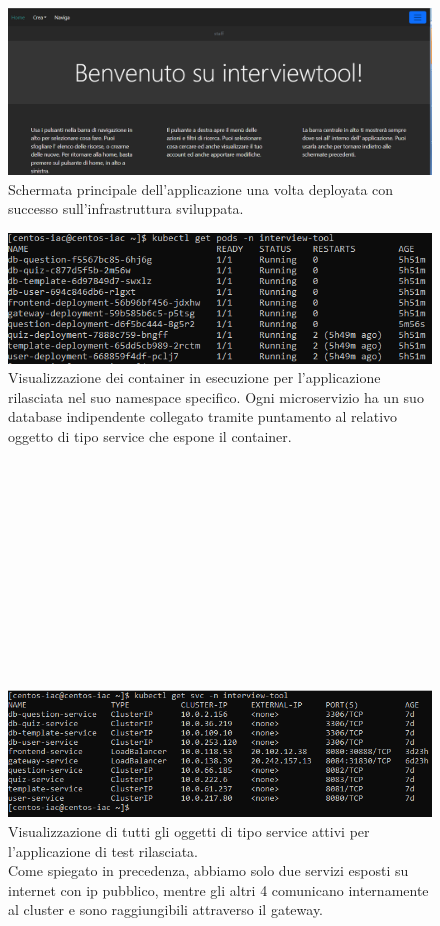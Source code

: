 \documentclass[a4paper,12pt]{report}
\begin{document}
\begin{figure}[h]
	\includegraphics[width=1.0\textwidth]{app_micro}
    \caption{Schermata principale dell'applicazione una volta deployata con successo sull'infrastruttura sviluppata.}
    \label{fig:app_micro}
\end{figure} 
\begin{figure}[h]
	\includegraphics[width=1.0\textwidth]{app_micro2}
    \caption{Visualizzazione dei container in esecuzione per l'applicazione rilasciata nel suo namespace specifico. Ogni microservizio ha un suo database indipendente collegato tramite puntamento al relativo oggetto di tipo service che espone il container.}
    \label{fig:app_micro2}
\end{figure}   \leavevmode \\ \\ \\ \\ \\ \\ \\ \\ \\ \\ \\
\begin{figure}[h]
	\includegraphics[width=1.0\textwidth]{app_micro3}
    \caption{Visualizzazione di tutti gli oggetti di tipo service attivi per l'applicazione di test rilasciata.\\Come spiegato in precedenza, abbiamo solo due servizi esposti su internet con ip pubblico, mentre gli altri 4 comunicano internamente al cluster e sono raggiungibili attraverso il gateway.}
    \label{fig:app_micro3}
\end{figure} \leavevmode \\ \\ \\ \\ \\ 
\end{document}
